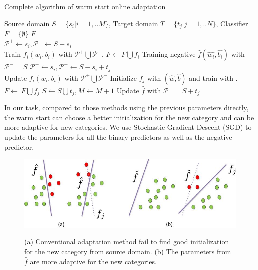 \begin{algorithm}
  \caption{Complete algorithm of warm start online adaptation}\label{algo:ws}
  \begin{algorithmic}[1]
    \REQUIRE Source domain $S = \{ {s_i}|i = 1,..M\} $, Target domain $T = \{ {t_j}|j = 1,..N\} $, Classifier $F = \{\emptyset\}$
    \ENSURE $F$\\
         \STATE $\mathcal{P^+}\leftarrow s_i, \mathcal{P^-}\leftarrow S-s_i$\\
          Train ${{f_i}\left( {{w_i},{b_i}} \right)}$ with $\mathcal{P^+}\bigcup\mathcal{P^-}$, $F\leftarrow F\bigcup f_i$
    \ENDFOR
    \STATE Training negative $\hat{f}\left( {\hat{w_i},\hat{b_i}} \right)$ with $\mathcal{P^-}=S$
             \STATE $\mathcal{P^+}\leftarrow s_i, \mathcal{P^-}\leftarrow S-s_i+t_j$ \\
              Update ${{f_i}\left( {{w_i},{b_i}} \right)}$ with $\mathcal{P^+}\bigcup\mathcal{P^-}$
        \ENDFOR
        \STATE Initialize $f_j$ with $(\hat{w},\hat{b})$ and train with .
        \STATE $F\leftarrow\ F\bigcup f_j$
        \STATE $S\leftarrow S\bigcup t_j, M\leftarrow M+1$
        \STATE Update $\hat{f}$ with $\mathcal{P^-}=S+t_j$
     \ENDWHILE
  \end{algorithmic}
\end{algorithm}

In our task, compared to those methods using the previous parameters directly, the warm start can choose a better initialization for the new category and can be more adaptive for new categories. We use Stochastic Gradient Descent (SGD) to update the parameters for all the binary predictors as well as the negative predictor.

\begin{figure}
  \centering
  \includegraphics[scale = .6]{fig/domain.jpg}\\
  \caption{(a) Conventional adaptation method fail to find good initialization for the new category from source domain. (b) The parameters from $\hat{f}$ are more adaptive for the new categories.}
  \label{fig:wm}
\end{figure}

